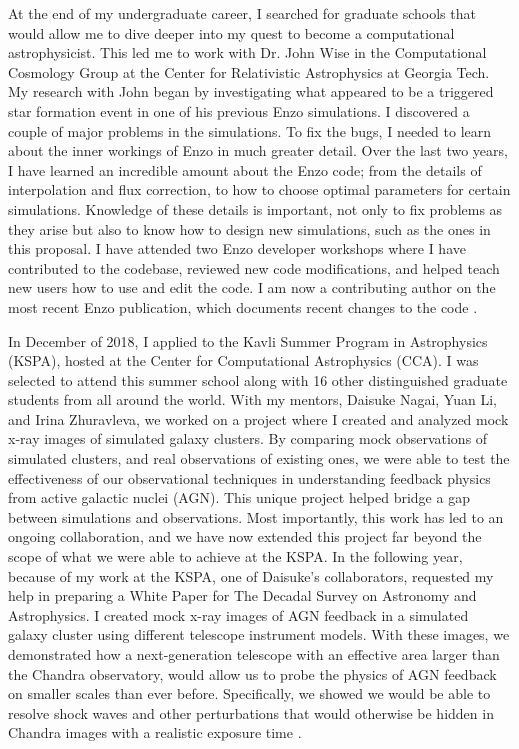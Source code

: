\documentclass[letterpaper, 12pt]{article}
\begin{document}
At the end of my undergraduate career, I searched for graduate schools that would allow me to dive deeper into my quest to become a computational astrophysicist. This led me to work with Dr. John Wise in the Computational Cosmology Group at the Center for Relativistic Astrophysics at Georgia Tech. My research with John began by investigating what appeared to be a triggered star formation event in one of his previous Enzo simulations. I discovered a couple of major problems in the simulations. To fix the bugs, I needed to learn about the inner workings of Enzo in much greater detail. Over the last two years, I have learned an incredible amount about the Enzo code; from the details of interpolation and flux correction, to how to choose optimal parameters for certain simulations. Knowledge of these details is important, not only to fix problems as they arise but also to know how to design new simulations, such as the ones in this proposal. I have attended two Enzo developer workshops where I have contributed to the codebase, reviewed new code modifications, and helped teach new users how to use and edit the code. I am now a contributing author on the most recent Enzo publication, which documents recent changes to the code \citep{ENZO2019_JOSS}.

In December of 2018, I applied to the Kavli Summer Program in Astrophysics (KSPA), hosted at the Center for Computational Astrophysics (CCA). I was selected to attend this summer school along with 16 other distinguished graduate students from all around the world. With my mentors, Daisuke Nagai, Yuan Li, and Irina Zhuravleva, we worked on a project where I created and analyzed mock x-ray images of simulated galaxy clusters. By comparing mock observations of simulated clusters, and real observations of existing ones, we were able to test the effectiveness of our observational techniques in understanding feedback physics from active galactic nuclei (AGN). This unique project helped bridge a gap between simulations and observations. Most importantly, this work has led to an ongoing collaboration, and we have now extended this project far beyond the scope of what we were able to achieve at the KSPA.
In the following year, because of my work at the KSPA, one of Daisuke’s collaborators, requested my help in preparing a White Paper for The Decadal Survey on Astronomy and Astrophysics. I created mock x-ray images of AGN feedback in a simulated galaxy cluster using different telescope instrument models. With these images, we demonstrated how a next-generation telescope with an effective area larger than the Chandra observatory, would allow us to probe the physics of AGN feedback on smaller scales than ever before. Specifically, we showed we would be able to resolve shock waves and other perturbations that would otherwise be hidden in Chandra images with a realistic exposure time \citep{WP_Ruszkowski2019}. 
\end{document}
